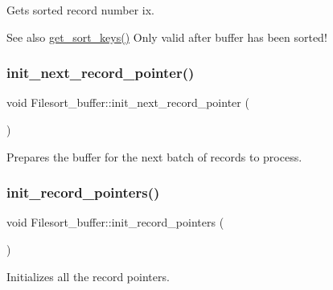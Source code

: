 Gets sorted record number ix. \begin{DoxySeeAlso}{See also}
\mbox{\hyperlink{classFilesort__buffer_ab833d1ea135e1651b55087cbe923dbf5}{get\+\_\+sort\+\_\+keys()}} Only valid after buffer has been sorted! 
\end{DoxySeeAlso}
\mbox{\label{classFilesort__buffer_a2154d7e1b6689811f69d7906a7b3d9dd}} 
\subsubsection{\texorpdfstring{init\+\_\+next\+\_\+record\+\_\+pointer()}{init\_next\_record\_pointer()}}
{\footnotesize\ttfamily void Filesort\+\_\+buffer\+::init\+\_\+next\+\_\+record\+\_\+pointer (\begin{DoxyParamCaption}{ }\end{DoxyParamCaption})\hspace{0.3cm}{\ttfamily [inline]}}

Prepares the buffer for the next batch of records to process. \mbox{\label{classFilesort__buffer_acde96dcd74d1e6594c7055196e316d35}} 
\subsubsection{\texorpdfstring{init\+\_\+record\+\_\+pointers()}{init\_record\_pointers()}}
{\footnotesize\ttfamily void Filesort\+\_\+buffer\+::init\+\_\+record\+\_\+pointers (\begin{DoxyParamCaption}{ }\end{DoxyParamCaption})\hspace{0.3cm}{\ttfamily [inline]}}

Initializes all the record pointers. \mbox{\label{classFilesort__buffer_aecbe946a71096aab8e07249d318304f1}} 
